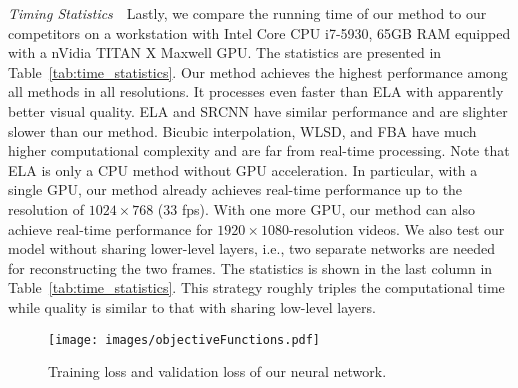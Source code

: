 \vspace{0.15in}
\noindent\emph{Timing Statistics}\,\,\,\,
Lastly, we compare the running time of our method to our competitors on a
workstation with Intel Core CPU i7-5930, 65GB RAM equipped with a nVidia TITAN X
Maxwell GPU. The statistics are presented in Table~\ref{tab:time_statistics}.
Our method achieves the highest performance among all methods in all
resolutions. It processes even faster than ELA with apparently better visual
quality. ELA and SRCNN have similar performance and are slighter slower than our
method. Bicubic interpolation, WLSD, and FBA have much higher computational
complexity and are far from real-time processing.  Note that ELA is only a CPU
method without GPU acceleration. In particular, with a single GPU, our method
already achieves real-time performance up to the resolution of $1024\times 768$
(33 fps). With one more GPU, our method can also achieve real-time performance
for $1920\times 1080$-resolution videos. We also test our model without sharing
lower-level layers, i.e., two separate networks are needed for reconstructing
the two frames. The statistics is shown in the last column in
Table~\ref{tab:time_statistics}. This strategy roughly triples the computational
time while quality is similar to that with sharing low-level layers.


\begin{figure}[!tp]
	\centering
	\texttt{[image: images/objectiveFunctions.pdf]}\\
	\caption{Training loss and validation loss of our neural network.}\label{fig:training_loss}
\end{figure}


